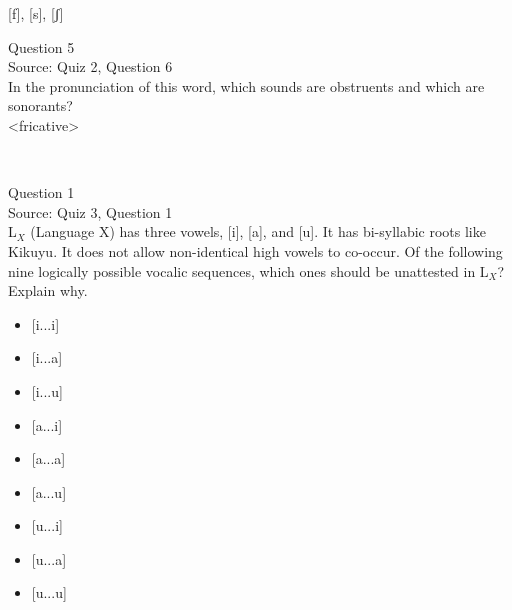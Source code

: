 \documentclass[12pt]{article}
\begin{document}
{[f]}, {[s]}, {[ʃ]}


\newpage

{\large Question 5}\\

Source: Quiz 2, Question 6\\

In the pronunciation of this word, which sounds are obstruents and which are sonorants?\\

<fricative>


\newpage

\begin{center}
\textbf{{\color{red}{\HUGE END OF EXAM}}}\\

\end{center}
\newpage

\begin{center}
\textbf{{\color{blue}{\HUGE START OF EXAM\\}}}

\textbf{{\color{blue}{\HUGE Student ID: 4199\\}}}

\textbf{{\color{blue}{\HUGE 3:15 - 3:30 PM\\}}}

\end{center}
\newpage

{\large Question 1}\\

Source: Quiz 3, Question 1\\

L$_X$ (Language X) has three vowels, [i], [a], and [u]. It has bi-syllabic roots like Kikuyu. It does not allow non-identical high vowels to co-occur. Of the following nine logically possible vocalic sequences, which ones should be unattested in L$_X$? Explain why.\\

\begin{itemize} \item {[i...i]} \item {[i...a]} \item {[i...u]} \item {[a...i]} \item {[a...a]} \item {[a...u]} \item {[u...i]} \item {[u...a]} \item {[u...u]} \end{itemize}
\end{document}
